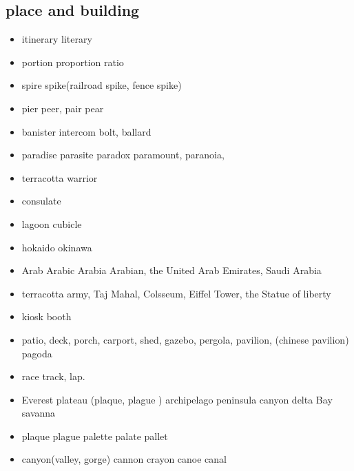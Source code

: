 \documentclass[a4paper,11pt,twoside]{book}
\begin{document}
\subsection{place and building}
\begin{itemize}
	\item itinerary literary
	\item portion proportion ratio 
	
	\item spire spike(railroad spike, fence spike)
	
	\item pier peer,  pair pear
	
	\item banister intercom bolt, ballard

	\item paradise parasite paradox paramount, paranoia, 
	
	\item terracotta warrior

	\item consulate

	\item lagoon cubicle

	\item hokaido okinawa 
	
	\item Arab Arabic  Arabia Arabian, the United Arab Emirates, Saudi Arabia
	
	\item terracotta army, Taj Mahal, Colsseum, Eiffel Tower, the Statue of liberty
	
	\item kiosk booth
	
	\item patio, deck, porch, carport, shed, gazebo, pergola, pavilion, (chinese pavilion)  pagoda
		
	\item race track, lap. 
	
	\item Everest plateau (plaque, plague ) archipelago peninsula canyon delta Bay savanna 
	
	\item plaque plague palette palate pallet
	
	\item canyon(valley, gorge) cannon crayon canoe canal	
	
\end{itemize}
\end{document}
